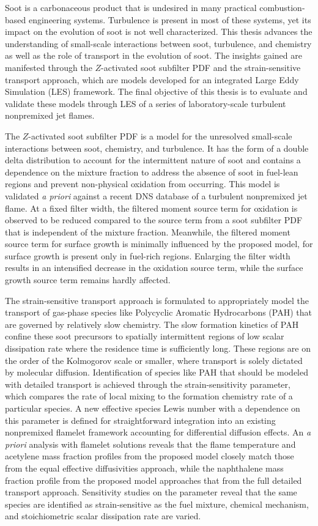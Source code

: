 Soot is a carbonaceous product that is undesired in many practical combustion-based engineering systems. Turbulence is present in most of these systems, yet its impact on the evolution of soot is not well characterized. This thesis advances the understanding of small-scale interactions between soot, turbulence, and chemistry as well as the role of transport in the evolution of soot. The insights gained are manifested through the $Z$-activated soot subfilter PDF and the strain-sensitive transport approach, which are models developed for an integrated Large Eddy Simulation (LES) framework. The final objective of this thesis is to evaluate and validate these models through LES of a series of laboratory-scale turbulent nonpremixed jet flames.

The $Z$-activated soot subfilter PDF is a model for the unresolved small-scale interactions between soot, chemistry, and turbulence. It has the form of a double delta distribution to account for the intermittent nature of soot and contains a dependence on the mixture fraction to address the absence of soot in fuel-lean regions and prevent non-physical oxidation from occurring. This model is validated \textit{a priori} against a recent DNS database of a turbulent nonpremixed jet flame. At a fixed filter width, the filtered moment source term for oxidation is observed to be reduced compared to the source term from a soot subfilter PDF that is independent of the mixture fraction. Meanwhile, the filtered moment source term for surface growth is minimally influenced by the proposed model, for surface growth is present only in fuel-rich regions. Enlarging the filter width results in an intensified decrease in the oxidation source term, while the surface growth source term remains hardly affected.

The strain-sensitive transport approach is formulated to appropriately model the transport of gas-phase species like Polycyclic Aromatic Hydrocarbons (PAH) that are governed by relatively slow chemistry. The slow formation kinetics of PAH confine these soot precursors to spatially intermittent regions of low scalar dissipation rate where the residence time is sufficiently long. These regions are on the order of the Kolmogorov scale or smaller, where transport is solely dictated by molecular diffusion. Identification of species like PAH that should be modeled with detailed transport is achieved through the strain-sensitivity parameter, which compares the rate of local mixing to the formation chemistry rate of a particular species. A new effective species Lewis number with a dependence on this parameter is defined for straightforward integration into an existing nonpremixed flamelet framework accounting for differential diffusion effects. An \textit{a priori} analysis with flamelet solutions reveals that the flame temperature and acetylene mass fraction profiles from the proposed model closely match those from the equal effective diffusivities approach, while the naphthalene mass fraction profile from the proposed model approaches that from the full detailed transport approach. Sensitivity studies on the parameter reveal that the same species are identified as strain-sensitive as the fuel mixture, chemical mechanism, and stoichiometric scalar dissipation rate are varied.

